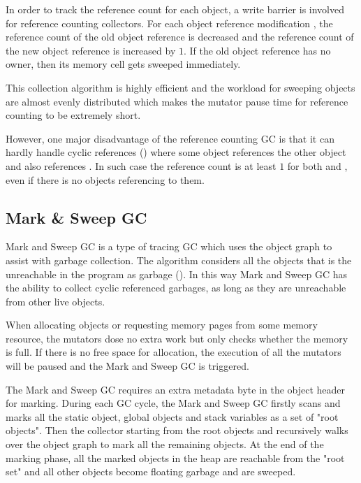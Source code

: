 In order to track the reference count for each object, a write barrier is involved
for reference counting collectors.
For each object reference modification , the reference count of
the old object reference is decreased and the reference count of the new object reference
is increased by $1$. If the old object reference has no owner, then its memory cell gets sweeped immediately.

This collection algorithm is highly efficient and the workload for sweeping objects are
almost evenly distributed which makes the mutator pause time for reference counting
to be extremely short.

However, one major disadvantage of the reference counting GC is that it can hardly
handle cyclic references (\cite{lins1992cyclic}) where some object  references the other object
 and  also references . In such case the reference
count is at least $1$ for both  and , even if there is no
objects referencing to them.

\subsection{Mark \& Sweep GC}

Mark and Sweep GC is a type of tracing GC which uses the object graph to assist with garbage collection.
The algorithm considers all the objects that is the unreachable in the program as garbage (\cite{endo1997scalable}).
In this way Mark and Sweep GC has the ability to collect cyclic referenced garbages,
as long as they are unreachable from other live objects.


When allocating objects or requesting memory pages from some memory resource,
the mutators dose no extra work but only checks whether the memory is full.
If there is no free space for allocation, the execution of all the mutators will be
paused and the Mark and Sweep GC is triggered.

The Mark and Sweep GC requires an extra metadata byte in the object header for marking.
During each GC cycle, the Mark and Sweep GC firstly scans and marks all the static object,
global objects and stack variables as a set of "root objects".
Then the collector starting from the root objects and recursively walks over the
object graph to mark all the remaining objects. At the end of the marking phase,
all the marked objects in the heap are reachable from the "root set" and all other
objects become floating garbage and are sweeped.


